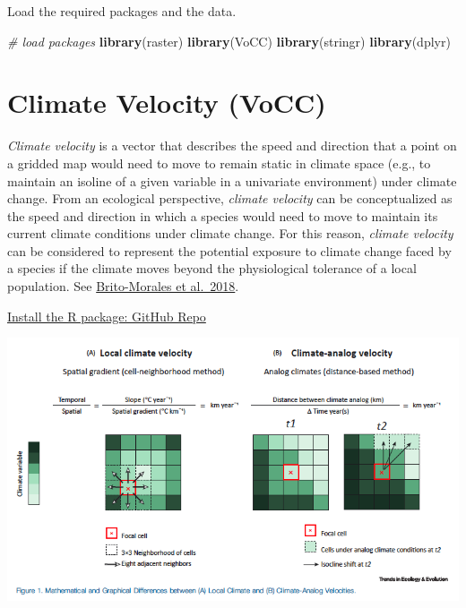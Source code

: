 \documentclass[]{book}
\newenvironment{Shaded}{\begin{snugshade}}{\end{snugshade}}
\newcommand{\CommentTok}[1]{\textcolor[rgb]{0.56,0.35,0.01}{\textit{#1}}}
\newcommand{\KeywordTok}[1]{\textcolor[rgb]{0.13,0.29,0.53}{\textbf{#1}}}
\newcommand{\NormalTok}[1]{#1}
\begin{document}
Load the required packages and the data.

\begin{Shaded}
\begin{Highlighting}[]
\CommentTok{# load packages}
  \KeywordTok{library}\NormalTok{(raster)}
  \KeywordTok{library}\NormalTok{(VoCC)}
  \KeywordTok{library}\NormalTok{(stringr)}
  \KeywordTok{library}\NormalTok{(dplyr)}
\end{Highlighting}
\end{Shaded}

\hypertarget{climate-velocity-vocc}{%
\section{Climate Velocity (VoCC)}\label{climate-velocity-vocc}}

\emph{Climate velocity} is a vector that describes the speed and direction that a point on a gridded map would need to move to remain static in climate space (e.g., to maintain an isoline of a given variable in a univariate environment) under climate change. From an ecological perspective, \emph{climate velocity} can be conceptualized as the speed and direction in which a species would need to move to maintain its current climate conditions under climate change. For this reason, \emph{climate velocity} can be considered to represent the potential exposure to climate change faced by a species if the climate moves beyond the physiological tolerance of a local population. See \href{https://www.sciencedirect.com/science/article/pii/S0169534718300636?casa_token=x8K3zBG-CkwAAAAA:HiDxHChsoKHoonPvIPKOSNQMu3krUEUcMFYOBUYdRLuEhikg2MJ6MdyRKOHenfk3frdXMLjAeyc}{Brito-Morales et al.~2018}.

\href{https://github.com/JorGarMol/VoCC}{Install the R package: GitHub Repo}

\includegraphics[width=1\linewidth]{images/VoCC_01}
\end{document}
